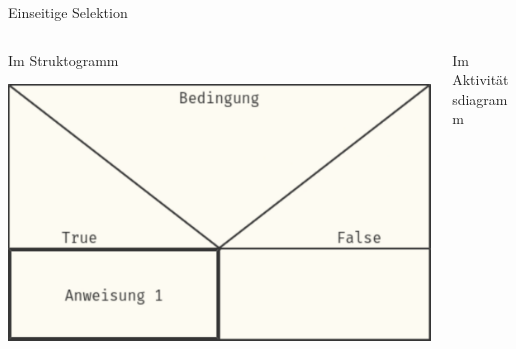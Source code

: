 \documentclass[xelatex,aspectratio=169]{beamer}
\begin{document}
\begin{frame}{Einseitige Selektion}

  \begin{columns}[t]
    \begin{column}{.4\linewidth}
      \begin{block}{Im Struktogramm}
        \begin{minipage}[c][.7\textheight][c]{\textwidth}
          \centering
          \includegraphics[width=\textwidth]{fig/algorithmus_einseitige_selektion_struktogram.pdf}
        \end{minipage}
      \end{block}
    \end{column}
    \begin{column}{.3\linewidth}
      \begin{block}{Im Aktivitätsdiagramm}
        \begin{minipage}[c][.7\textheight][c]{\textwidth}
          \centering

\end{minipage}
\end{block}
\end{column}
\end{columns}
\end{frame}
\end{document}
